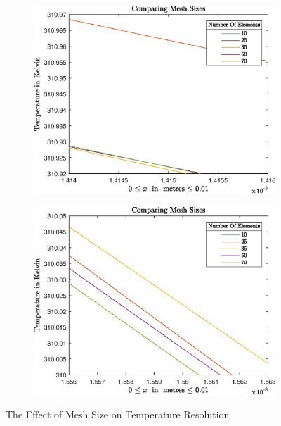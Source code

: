 \documentclass[11pt]{article}
\begin{document}
\begin{figure}[ht] 
        \centering
        \begin{subfigure}[b]{0.475\textwidth}
            \centering
            \includegraphics[width=\textwidth]{epsMesh11}
            \caption[Network2]%
            {{\small  }}    
            \label{fig:zoommesh1}
        \end{subfigure}
        \hfill
        \begin{subfigure}[b]{0.475\textwidth}  
            \centering 
            \includegraphics[width=\textwidth]{epsMesh12}
            \caption[]%
            {{\small }}    
            \label{fig:zoommesh2}
        \end{subfigure}
        \caption[ The Effect of Mesh Size on Temperature Resolution ]
        {\small The Effect of Mesh Size on Temperature Resolution } 
        \label{fig:meshzoom}
    \end{figure}
\end{document}
